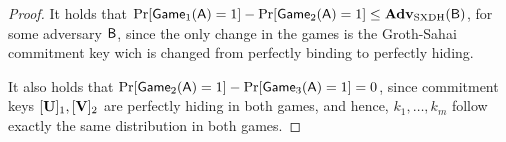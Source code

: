 \begin{proof}
It holds that $\Pr[\mathsf{Game}_1(\mathsf{A})=1]-\Pr[\mathsf{Game}_2(\mathsf{A})=1]\leq\mathbf{Adv}_\mathrm{SXDH}(\mathsf{B})$, for some adversary $\mathsf{B}$, since the only change in the games is the Groth-Sahai commitment key wich is changed from perfectly binding to perfectly hiding. %

It also holds that $\Pr[\mathsf{Game}_2(\mathsf{A})=1]-\Pr[\mathsf{Game}_3(\mathsf{A})=1]=0$, since commitment keys $[\mathbf{{U}}]_1,[\mathbf{{V}}]_2$ are perfectly hiding in both games, and hence, $k_1,\ldots,k_m$ follow exactly the same distribution in both games.


\end{proof}
